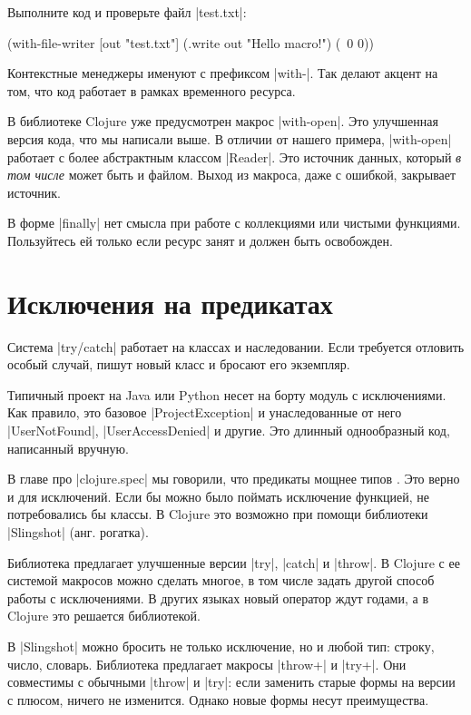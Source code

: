 \noindent
Выполните код и проверьте файл \spverb|test.txt|:

\begin{english}
  \begin{clojure}
(with-file-writer [out "test.txt"]
  (.write out "Hello macro!")
  (\ 0 0))
  \end{clojure}
\end{english}

Контекстные менеджеры именуют с префиксом \spverb|with-|. Так делают акцент на
том, что код работает в рамках временного ресурса.

В библиотеке Clojure уже предусмотрен макрос \spverb|with-open|. Это улучшенная
версия кода, что мы написали выше. В отличии от нашего примера,
\spverb|with-open| работает с более абстрактным классом \spverb|Reader|. Это
источник данных, который \emph{в том числе} может быть и файлом. Выход из
макроса, даже с ошибкой, закрывает источник.

В форме \spverb|finally| нет смысла при работе с коллекциями или чистыми
функциями. Пользуйтесь ей только если ресурс занят и должен быть освобожден.

\section{Исключения на предикатах}

Система \spverb|try/catch| работает на классах и наследовании. Если требуется
отловить особый случай, пишут новый класс и бросают его экземпляр.

Типичный проект на Java или Python несет на борту модуль с исключениями. Как
правило, это базовое \spverb|ProjectException| и унаследованные от него
\spverb|UserNotFound|, \spverb|UserAccessDenied| и другие. Это длинный
однообразный код, написанный вручную.

В главе про \spverb|clojure.spec| мы говорили, что предикаты мощнее типов
. Это верно и для исключений. Если бы можно было поймать
исключение функцией, не потребовались бы классы. В Clojure это возможно
при помощи библиотеки \spverb|Slingshot|
(анг. рогатка).

Библиотека предлагает улучшенные версии \spverb|try|, \spverb|catch| и
\spverb|throw|. В Clojure с ее системой макросов можно сделать многое, в том
числе задать другой способ работы с исключениями. В других языках новый оператор
ждут годами, а в Clojure это решается библиотекой.

В \spverb|Slingshot| можно бросить не только исключение, но и любой тип: строку,
число, словарь. Библиотека предлагает макросы \spverb|throw+| и
\spverb|try+|. Они совместимы с обычными \spverb|throw| и \spverb|try|: если
заменить старые формы на версии с плюсом, ничего не изменится. Однако новые
формы несут преимущества.

